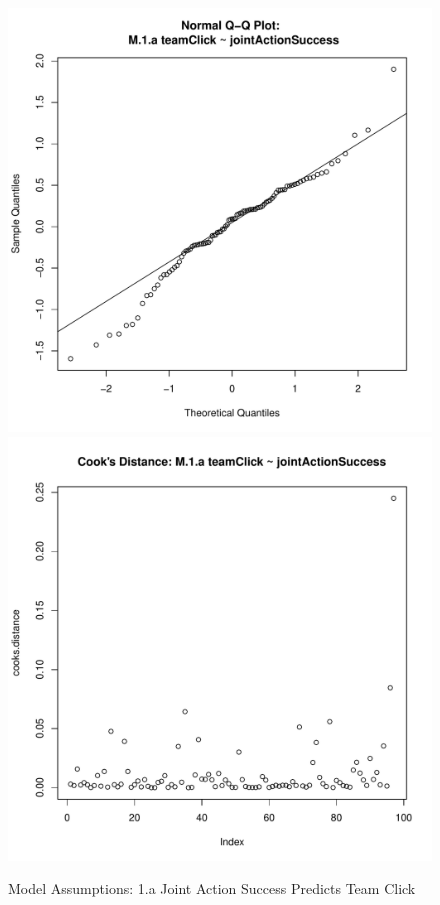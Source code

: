 {\begin{figure}[htbp]
    \includegraphics[scale =.4]{images/MLM1aQQPlot.pdf}
    \includegraphics[scale =.4]{images/MLM1aCooksD.pdf}
    \caption{Model Assumptions: 1.a Joint Action Success Predicts Team Click}
    \label{fig:MLM1aAssumptions}
\end{figure}





}
